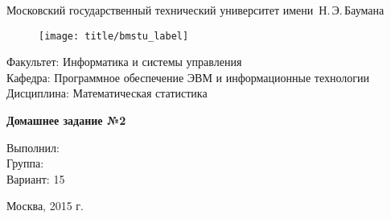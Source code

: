 
\thispagestyle{empty}

\begin{center}
    \Large
    Московский государственный технический университет имени~Н.\,Э.\,Баумана
\end{center}

\begin{figure}[h!]
    \begin{center}
        \texttt{[image: title/bmstu\_label]}
    \end{center}
\end{figure}

{\large
\noindent
Факультет: Информатика и системы управления\\[2mm]
\noindent
Кафедра: Программное обеспечение ЭВМ и информационные технологии\\[2mm]
\noindent
Дисциплина: Математическая статистика
\vspace{1.5cm}}

\begin{center}
    \Large
    \textbf{Домашнее задание №2} \\
\end{center}
\vfill

\hfill\begin{minipage}{0.35\textwidth}
    Выполнил: \\
    Группа: \\
    Вариант: 15
\end{minipage}
\vfill

\begin{center}
    Москва, 2015 г.
\end{center}